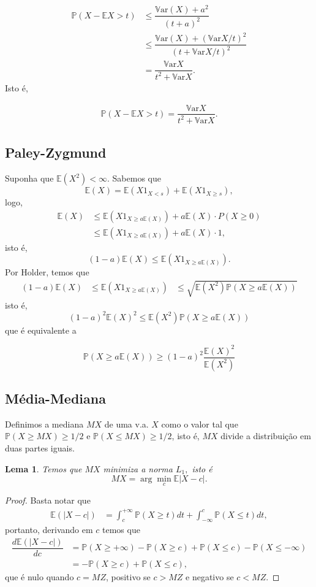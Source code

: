\documentclass[12pt,a4paper,oneside]{book}
\newtheorem{lemma}[theorem]{Lema}
\theoremstyle{definition}
\theoremstyle{remark}
\numberwithin{equation}{section}
\newcommand{\E}{\mathbb{E}}
\newcommand{\pr}{\mathbb{P}}
\newcommand{\Var}{\mathbb{V}\text{ar}}
\begin{document}
\begin{align*}
\pr(X-\E X> t) & \leq \dfrac{\Var(X)+a^2}{(t+a)^2}\\
	& \leq \dfrac{\Var(X)+(\Var X/t)^2}{(t+\Var X/t)^2}\\
	& =  \dfrac{\Var X}{t^2+\Var X}.
\end{align*}
Isto é,

\begin{tcolorbox}
\begin{align*}
\pr(X-\E X> t) = \dfrac{\Var X}{t^2+\Var X}.
\end{align*}
\end{tcolorbox}

\subsection{Paley-Zygmund} Suponha que $\E(X^2)<\infty.$ Sabemos que 
$$\E(X) = \E (X1_{X< s}) + \E (X1_{X\geq s}), $$
logo,
\begin{align*}
\E (X) &\leq \E (X1_{X\geq a\E(X)}) + a\E(X)\cdot P(X\geq 0)\\
&\leq \E (X1_{X\geq a\E(X)}) + a\E(X)\cdot 1,
\end{align*}
isto é,
$$ (1-a)\E(X)\leq \E (X1_{X\geq a\E(X)}).$$
Por Holder, temos que
$$
\begin{array}{ccc}
(1-a)\E(X) &\leq \E (X1_{X\geq a\E(X)}) &\leq \sqrt{\E(X^2)\pr(X\geq a\E(X))} 
\end{array}
$$
isto é, 
$$(1-a)^2\E(X)^2 \leq  \E(X^2)\pr(X\geq a\E(X)) $$
que é equivalente a
\begin{tcolorbox}
$$\pr(X\geq a\E(X)) \geq (1-a)^2\dfrac{\E(X)^2}{\E(X^2)}$$
\end{tcolorbox}

\subsection{Média-Mediana} Definimos a mediana $MX$ de uma v.a. $X$ como o valor tal que $\pr(X\geq MX)\geq 1/2$ e $\pr(X\leq MX)\geq 1/2$, isto é, $MX$ divide a distribuição em duas partes iguais.

\begin{lemma}
Temos que $MX$ minimiza a norma $L_1, $ isto é
$$MX = \arg\min_c \E|X-c|. $$  
\end{lemma}
\begin{proof}
Basta notar que
\begin{align*}
\E(|X-c|) & = \int_c^{+\infty}\pr(X\geq t)dt + \int^c_ {-\infty}\pr(X\leq  t)dt,
\end{align*}
portanto, derivando em $c$ temos que
\begin{align*}
\dfrac{d\E(|X-c|)}{dc} & = \pr(X\geq +\infty) -\pr(X\geq c) + \pr(X\leq c)-\pr(X\leq -\infty)\\
& = -\pr(X\geq c) + \pr(X\leq c),
\end{align*}
que é nulo quando $c=MZ$, positivo se $c>MZ$ e negativo se $c<MZ$.
\end{proof}
\end{document}

